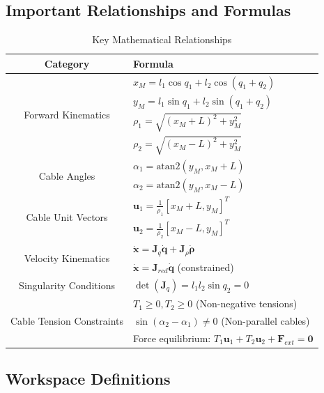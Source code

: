 \subsection{Important Relationships and Formulas}

\begin{table}[h!]
\centering
\caption{Key Mathematical Relationships}
\begin{tabular}{|c|l|}
\hline
\textbf{Category} & \textbf{Formula} \\
\hline
\multirow{4}{*}{Forward Kinematics} & $x_M = l_1\cos q_1 + l_2\cos(q_1 + q_2)$ \\
& $y_M = l_1\sin q_1 + l_2\sin(q_1 + q_2)$ \\
& $\rho_1 = \sqrt{(x_M + L)^2 + y_M^2}$ \\
& $\rho_2 = \sqrt{(x_M - L)^2 + y_M^2}$ \\
\hline
\multirow{2}{*}{Cable Angles} & $\alpha_1 = \text{atan2}(y_M, x_M + L)$ \\
& $\alpha_2 = \text{atan2}(y_M, x_M - L)$ \\
\hline
\multirow{2}{*}{Cable Unit Vectors} & $\bm{u}_1 = \frac{1}{\rho_1}[x_M + L, y_M]^T$ \\
& $\bm{u}_2 = \frac{1}{\rho_2}[x_M - L, y_M]^T$ \\
\hline
\multirow{2}{*}{Velocity Kinematics} & $\dot{\bm{x}} = \bm{J}_q \dot{\bm{q}} + \bm{J}_{\rho} \dot{\bm{\rho}}$ \\
& $\dot{\bm{x}} = \bm{J}_{red} \dot{\bm{q}}$ (constrained) \\
\hline
Singularity Conditions & $\det(\bm{J}_q) = l_1 l_2 \sin q_2 = 0$ \\
\hline
\multirow{3}{*}{Cable Tension Constraints} & $T_1 \geq 0, T_2 \geq 0$ (Non-negative tensions) \\
& $\sin(\alpha_2 - \alpha_1) \neq 0$ (Non-parallel cables) \\
& Force equilibrium: $T_1 \bm{u}_1 + T_2 \bm{u}_2 + \bm{F}_{ext} = \bm{0}$ \\
\hline
\end{tabular}
\end{table}

\subsection{Workspace Definitions}

